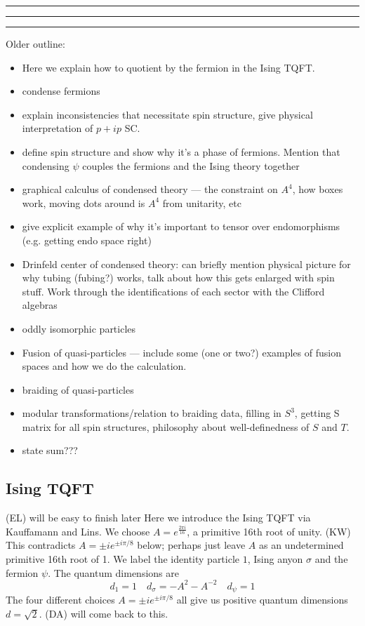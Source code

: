 \documentclass[12pt,a4paper]{article}
\newcommand\be            {\begin{equation}}
\newcommand\ee            {\end{equation}}
\newcommand{\dave}[1]{{\color{ao(english)}\footnotesize{(DA) #1}}}
\newcommand{\ethan}[1]{{\color{amethyst}\footnotesize{(EL) #1}}}
\newcommand{\kw}[1]{{\color{kwcolor}\footnotesize{(KW) #1}}}
\newcommand{\kwsep}{\bigskip\hrule\medskip\hrule\medskip\hrule\bigskip}
\begin{document}
\kwsep

Older outline:

\begin{itemize}
\item Here we explain how to quotient by the fermion in the Ising TQFT. 
\item condense fermions
\item explain inconsistencies that necessitate spin structure, give physical interpretation of $p+ip$ SC.
\item define spin structure and show why it's a phase of fermions. Mention that condensing $\psi$ couples the fermions and the Ising theory together 
\item graphical calculus of condensed theory --- the constraint on $A^4$, how boxes work, moving dots around is $A^4$ from unitarity, etc
\item give explicit example of why it's important to tensor over endomorphisms (e.g. getting endo space right)
\item Drinfeld center of condensed theory: can briefly mention physical picture for why tubing (fubing?) works, talk about how this gets enlarged with spin stuff. Work through the identifications of each sector with the Clifford algebras 
\item oddly isomorphic particles
\item Fusion of quasi-particles --- include some (one or two?) examples of fusion spaces and how we do the calculation. 
\item braiding of quasi-particles 
\item modular transformations/relation to braiding data, filling in $S^3$, getting S matrix for all spin structures, philosophy about well-definedness of $S$ and $T$. 
\item state sum???
\end{itemize}



\subsection{Ising TQFT} \ethan{will be easy to finish later}
Here we introduce the Ising TQFT via Kauffamann and Lins\cite{Lins1994}. 
We choose $A = e^{\frac{2 \pi i}{16}}$, a primitive 16th root of unity. 
\kw{This contradicts $A = \pm ie^{\pm i\pi/8}$ below; perhaps just leave $A$ as an undetermined
primitive 16th root of 1.}
We label the identity particle $1$, Ising anyon $\sigma$ and the fermion $\psi$.
The quantum dimensions are
\be
d_1 = 1 \quad d_\sigma = -A^2 - A^{-2} \quad d_\psi =1 
\ee
The four different choices $A = \pm ie^{\pm i\pi/8}$ all give us positive quantum dimensions $d = \sqrt{2}$. 
\dave{will come back to this.}
\end{document}
